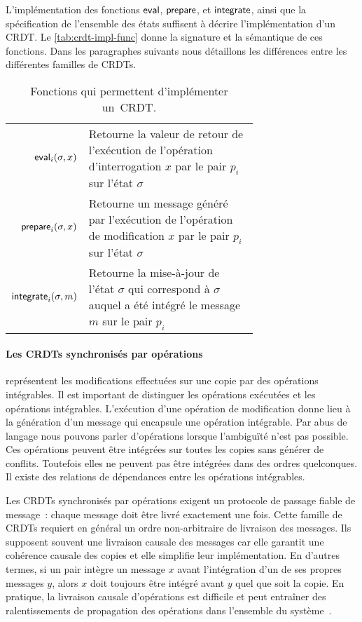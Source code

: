 L'implémentation des fonctions $\operatorname{\mathsf{eval}}$, $\operatorname{\mathsf{prepare}}$, et $\operatorname{\mathsf{integrate}}$, ainsi que la spécification de l'ensemble des états suffisent à décrire l'implémentation d'un \ac{CRDT}.
Le \autoref{tab:crdt-impl-func} donne la signature et la sémantique de ces fonctions.
Dans les paragraphes suivants nous détaillons les différences entre les différentes familles de \acp{CRDT}.

\begin{table}[htb]
\centering
\begin{tabular}{rp{0.7\linewidth}}
    $\operatorname{\mathsf{eval}}_i(\sigma, x)$ & Retourne la valeur de retour de l'exécution de l'opération d'interrogation $x$ par le pair $p_i$ sur l'état $\sigma$ \\
    $\operatorname{\mathsf{prepare}}_i(\sigma, x)$ & Retourne un message généré par l'exécution de l'opération de modification $x$ par le pair $p_i$ sur l'état $\sigma$ \\
    $\operatorname{\mathsf{integrate}}_i(\sigma, m)$ & Retourne la mise-à-jour de l'état $\sigma$ qui correspond à $\sigma$ auquel a été intégré le message $m$ sur le pair $p_i$\\
\end{tabular}
\caption[Fonctions qui permettent d'implémenter un~\ac{CRDT}]{Fonctions qui permettent d'implémenter un~\ac{CRDT}.}\label{tab:crdt-impl-func}
\end{table}


\paragraph{Les \acp{CRDT} synchronisés par opérations~\autocite{baquero_2014_pure-op-crdt,baquero_2018_pure-op-crdt}} représentent les modifications effectuées sur une copie par des opérations intégrables.
Il est important de distinguer les opérations exécutées et les opérations intégrables.
L'exécution d'une opération de modification donne lieu à la génération d'un message qui encapsule une opération intégrable.
Par abus de langage nous pouvons parler d'opérations lorsque l'ambiguïté n'est pas possible.
Ces opérations peuvent être intégrées sur toutes les copies sans générer de conflits.
Toutefois elles ne peuvent pas être intégrées dans des ordres quelconques.
Il existe des relations de dépendances entre les opérations intégrables.

Les \acp{CRDT} synchronisés par opérations exigent un protocole de passage fiable de message~: chaque message doit être livré exactement une fois.
Cette famille de \acp{CRDT} requiert en général un ordre non-arbitraire de livraison des messages.
Ils supposent souvent une livraison causale des messages car elle garantit une cohérence causale des copies et elle simplifie leur implémentation.
En d'autres termes, si un pair intègre un message $x$ avant l'intégration d'un de ses propres messages $y$, alors $x$ doit toujours être intégré avant $y$ quel que soit la copie.
En pratique, la livraison causale d'opérations est difficile et peut entraîner des ralentissements de propagation des opérations dans l'ensemble du système~\autocite{alvisi_2017_writes-dirty-secret}.

